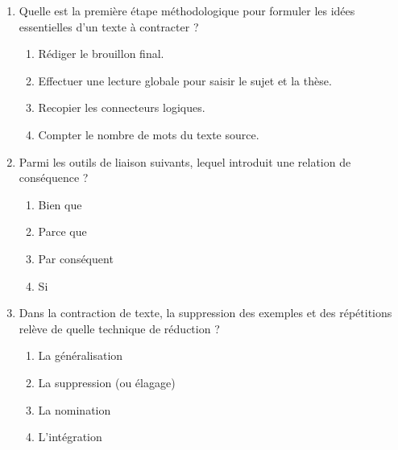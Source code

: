 \documentclass[11pt]{article}
\begin{document}
\begin{exercice}
\begin{enumerate}
    \item Quelle est la première étape méthodologique pour formuler les idées essentielles d'un texte à contracter ?
    \begin{enumerate}
        \item Rédiger le brouillon final.
        \item Effectuer une lecture globale pour saisir le sujet et la thèse.
        \item Recopier les connecteurs logiques.
        \item Compter le nombre de mots du texte source.
    \end{enumerate}
    \item Parmi les outils de liaison suivants, lequel introduit une relation de conséquence ?
    \begin{enumerate}
        \item Bien que
        \item Parce que
        \item Par conséquent
        \item Si
    \end{enumerate}
    \item Dans la contraction de texte, la suppression des exemples et des répétitions relève de quelle technique de réduction ?
    \begin{enumerate}
        \item La généralisation
        \item La suppression (ou élagage)
        \item La nomination
        \item L'intégration
    \end{enumerate}
\end{enumerate}
\end{exercice}
\end{document}
